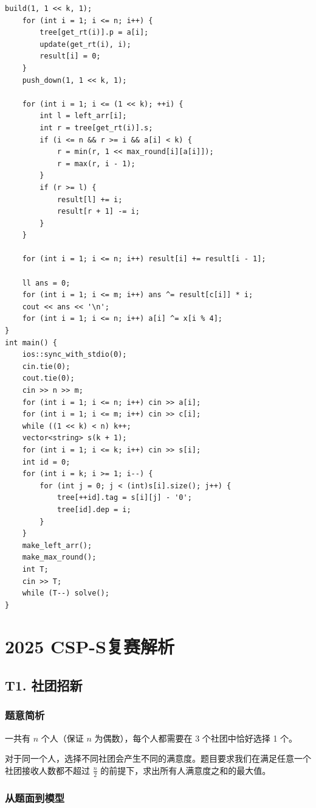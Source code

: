 \documentclass{book}
\begin{document}
\begin{lstlisting}[style = code]
    build(1, 1 << k, 1);
    for (int i = 1; i <= n; i++) {
        tree[get_rt(i)].p = a[i];
        update(get_rt(i), i);
        result[i] = 0;
    }
    push_down(1, 1 << k, 1);

    for (int i = 1; i <= (1 << k); ++i) {
        int l = left_arr[i];
        int r = tree[get_rt(i)].s;
        if (i <= n && r >= i && a[i] < k) {
            r = min(r, 1 << max_round[i][a[i]]);
            r = max(r, i - 1);
        }
        if (r >= l) {
            result[l] += i;
            result[r + 1] -= i;
        }
    }

    for (int i = 1; i <= n; i++) result[i] += result[i - 1];

    ll ans = 0;
    for (int i = 1; i <= m; i++) ans ^= result[c[i]] * i;
    cout << ans << '\n';
    for (int i = 1; i <= n; i++) a[i] ^= x[i % 4];
}
int main() {
    ios::sync_with_stdio(0);
    cin.tie(0);
    cout.tie(0);
    cin >> n >> m;
    for (int i = 1; i <= n; i++) cin >> a[i];
    for (int i = 1; i <= m; i++) cin >> c[i];
    while ((1 << k) < n) k++;
    vector<string> s(k + 1);
    for (int i = 1; i <= k; i++) cin >> s[i];
    int id = 0;
    for (int i = k; i >= 1; i--) {
        for (int j = 0; j < (int)s[i].size(); j++) {
            tree[++id].tag = s[i][j] - '0';
            tree[id].dep = i;
        }
    }
    make_left_arr();
    make_max_round();
    int T;
    cin >> T;
    while (T--) solve();
}
\end{lstlisting}

\chapter{2025 CSP-S复赛解析}
\section{T1. 社团招新}

\subsection{题意简析}

一共有 $n$ 个人（保证 $n$ 为偶数），每个人都需要在 3 个社团中恰好选择 1 个。

对于同一个人，选择不同社团会产生不同的满意度。题目要求我们在满足任意一个社团接收人数都不超过 $\frac{n}{2}$ 的前提下，求出所有人满意度之和的最大值。

\subsection{从题面到模型}
\end{document}
